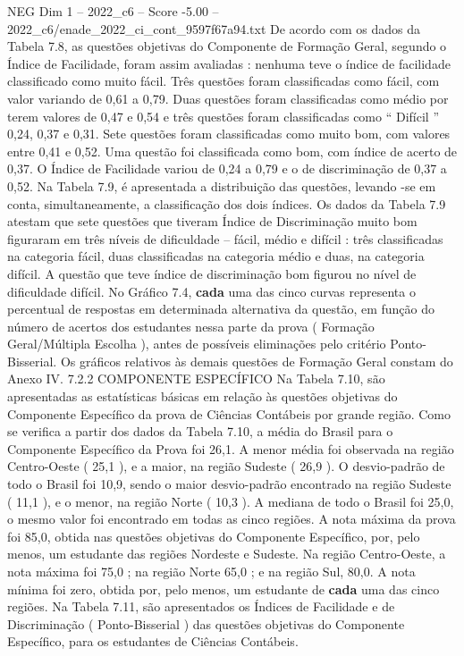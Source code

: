 \begin{textsample}{NEG Dim 1 – 2022\_c6 – Score -5.00 – 2022\_c6/enade\_2022\_ci\_cont\_9597f67a94.txt}
De acordo com os dados da Tabela 7.8, as questões objetivas do Componente de Formação Geral, segundo o Índice de Facilidade, foram assim avaliadas : nenhuma teve o índice de facilidade classificado como muito fácil.
Três questões foram classificadas como fácil, com valor variando de 0,61 a 0,79.
Duas questões foram classificadas como médio por terem valores de 0,47 e 0,54 e três questões foram classificadas como “ Difícil ” 0,24, 0,37 e 0,31.
Sete questões foram classificadas como muito bom, com valores entre 0,41 e 0,52.
Uma questão foi classificada como bom, com índice de acerto de 0,37.
O Índice de Facilidade variou de 0,24 a 0,79 e o de discriminação de 0,37 a 0,52.
Na Tabela 7.9, é apresentada a distribuição das questões, levando -se em conta, simultaneamente, a classificação dos dois índices.
Os dados da Tabela 7.9 atestam que sete questões que tiveram Índice de Discriminação muito bom figuraram em três níveis de dificuldade – fácil, médio e difícil : três classificadas na categoria fácil, duas classificadas na categoria médio e duas, na categoria difícil.
A questão que teve índice de discriminação bom figurou no nível de dificuldade difícil.
No Gráfico 7.4, \textbf{cada} uma das cinco curvas representa o percentual de respostas em determinada alternativa da questão, em função do número de acertos dos estudantes nessa parte da prova ( Formação Geral/Múltipla Escolha ), antes de possíveis eliminações pelo critério Ponto-Bisserial.
Os gráficos relativos às demais questões de Formação Geral constam do Anexo IV. 7.2.2 COMPONENTE ESPECÍFICO Na Tabela 7.10, são apresentadas as estatísticas básicas em relação às questões objetivas do Componente Específico da prova de Ciências Contábeis por grande região.
Como se verifica a partir dos dados da Tabela 7.10, a média do Brasil para o Componente Específico da Prova foi 26,1.
A menor média foi observada na região Centro-Oeste ( 25,1 ), e a maior, na região Sudeste ( 26,9 ).
O desvio-padrão de todo o Brasil foi 10,9, sendo o maior desvio-padrão encontrado na região Sudeste ( 11,1 ), e o menor, na região Norte ( 10,3 ).
A mediana de todo o Brasil foi 25,0, o mesmo valor foi encontrado em todas as cinco regiões.
A nota máxima da prova foi 85,0, obtida nas questões objetivas do Componente Específico, por, pelo menos, um estudante das regiões Nordeste e Sudeste.
Na região Centro-Oeste, a nota máxima foi 75,0 ; na região Norte 65,0 ; e na região Sul, 80,0.
A nota mínima foi zero, obtida por, pelo menos, um estudante de \textbf{cada} uma das cinco regiões.
Na Tabela 7.11, são apresentados os Índices de Facilidade e de Discriminação ( Ponto-Bisserial ) das questões objetivas do Componente Específico, para os estudantes de Ciências Contábeis.

\end{textsample}
